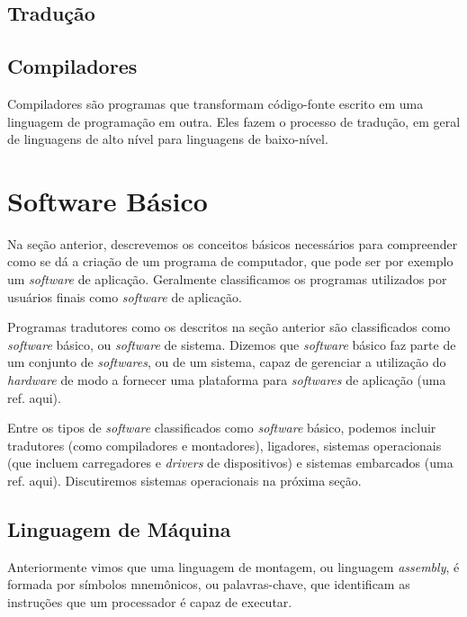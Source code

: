 \subsection{Tradução}



\subsection{Compiladores}

Compiladores são programas que transformam código-fonte escrito em uma linguagem
de programação em outra. Eles fazem o processo de tradução, em geral de
linguagens de alto nível para linguagens de baixo-nível.

\section{Software Básico}

Na seção anterior, descrevemos os conceitos básicos necessários para compreender
como se dá a criação de um programa de computador, que pode ser por exemplo um
\textit{software} de aplicação. Geralmente classificamos os programas utilizados
por usuários finais como \textit{software} de aplicação.

Programas tradutores como os descritos na seção anterior são classificados como
\textit{software} básico, ou \textit{software} de sistema. Dizemos que
\textit{software} básico faz parte de um conjunto de \textit{softwares}, ou de
um sistema, capaz de gerenciar a utilização do \textit{hardware} de modo a
fornecer uma plataforma para \textit{softwares} de aplicação (uma ref. aqui).

Entre os tipos de \textit{software} classificados como \textit{software} básico,
podemos incluir tradutores (como compiladores e montadores), ligadores, sistemas
operacionais (que incluem carregadores e \textit{drivers} de dispositivos) e
sistemas embarcados (uma ref. aqui). Discutiremos sistemas operacionais na
próxima seção.

\subsection{Linguagem de Máquina}
\label{subsec:linguagem_maquina}

Anteriormente vimos que uma linguagem de montagem, ou linguagem
\textit{assembly}, é formada por símbolos mnemônicos, ou palavras-chave, que
identificam as instruções que um processador é capaz de executar.

